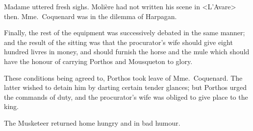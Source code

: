 Madame uttered fresh sighs. Molière had not written his scene in <L'Avare> then. Mme.~Coquenard was in the dilemma of Harpagan. 

Finally, the rest of the equipment was successively debated in the same manner; and the result of the sitting was that the procurator's wife should give eight hundred livres in money, and should furnish the horse and the mule which should have the honour of carrying Porthos and Mousqueton to glory. 

These conditions being agreed to, Porthos took leave of Mme.~Coquenard. The latter wished to detain him by darting certain tender glances; but Porthos urged the commands of duty, and the procurator's wife was obliged to give place to the king. 

The Musketeer returned home hungry and in bad humour. 
